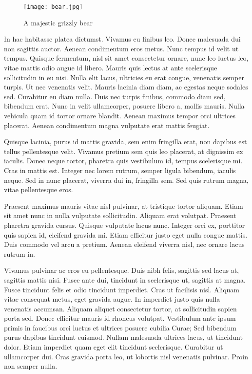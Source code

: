 \documentclass[10pt, a4paper, twocolumn]{article} %
\begin{document}
\begin{figure}
	\texttt{[image: bear.jpg]} %
	\caption{A majestic grizzly bear} %
	\label{bear} %
\end{figure}

In hac habitasse platea dictumst. Vivamus eu finibus leo. Donec malesuada dui non sagittis auctor. Aenean condimentum eros metus. Nunc tempus id velit ut tempus. Quisque fermentum, nisl sit amet consectetur ornare, nunc leo luctus leo, vitae mattis odio augue id libero. Mauris quis lectus at ante scelerisque sollicitudin in eu nisi. Nulla elit lacus, ultricies eu erat congue, venenatis semper turpis. Ut nec venenatis velit. Mauris lacinia diam diam, ac egestas neque sodales sed. Curabitur eu diam nulla. Duis nec turpis finibus, commodo diam sed, bibendum erat. Nunc in velit ullamcorper, posuere libero a, mollis mauris. Nulla vehicula quam id tortor ornare blandit. Aenean maximus tempor orci ultrices placerat. Aenean condimentum magna vulputate erat mattis feugiat.

Quisque lacinia, purus id mattis gravida, sem enim fringilla erat, non dapibus est tellus pellentesque velit. Vivamus pretium sem quis leo placerat, at dignissim ex iaculis. Donec neque tortor, pharetra quis vestibulum id, tempus scelerisque mi. Cras in mattis est. Integer nec lorem rutrum, semper ligula bibendum, iaculis neque. Sed in nunc placerat, viverra dui in, fringilla sem. Sed quis rutrum magna, vitae pellentesque eros.

Praesent maximus mauris vitae nisl pulvinar, at tristique tortor aliquam. Etiam sit amet nunc in nulla vulputate sollicitudin. Aliquam erat volutpat. Praesent pharetra gravida cursus. Quisque vulputate lacus nunc. Integer orci ex, porttitor quis sapien id, eleifend gravida mi. Etiam efficitur justo eget nulla congue mattis. Duis commodo vel arcu a pretium. Aenean eleifend viverra nisl, nec ornare lacus rutrum in.

Vivamus pulvinar ac eros eu pellentesque. Duis nibh felis, sagittis sed lacus at, sagittis mattis nisi. Fusce ante dui, tincidunt in scelerisque ut, sagittis at magna. Fusce tincidunt felis et odio tincidunt imperdiet. Cras ut facilisis nisl. Aliquam vitae consequat metus, eget gravida augue. In imperdiet justo quis nulla venenatis accumsan. Aliquam aliquet consectetur tortor, at sollicitudin sapien porta sed. Donec efficitur mauris id rhoncus volutpat. Vestibulum ante ipsum primis in faucibus orci luctus et ultrices posuere cubilia Curae; Sed bibendum purus dapibus tincidunt euismod. Nullam malesuada ultrices lacus, ut tincidunt dolor. Etiam imperdiet quam eget elit tincidunt scelerisque. Curabitur ut ullamcorper dui. Cras gravida porta leo, ut lobortis nisl venenatis pulvinar. Proin non semper nulla.
\end{document}
